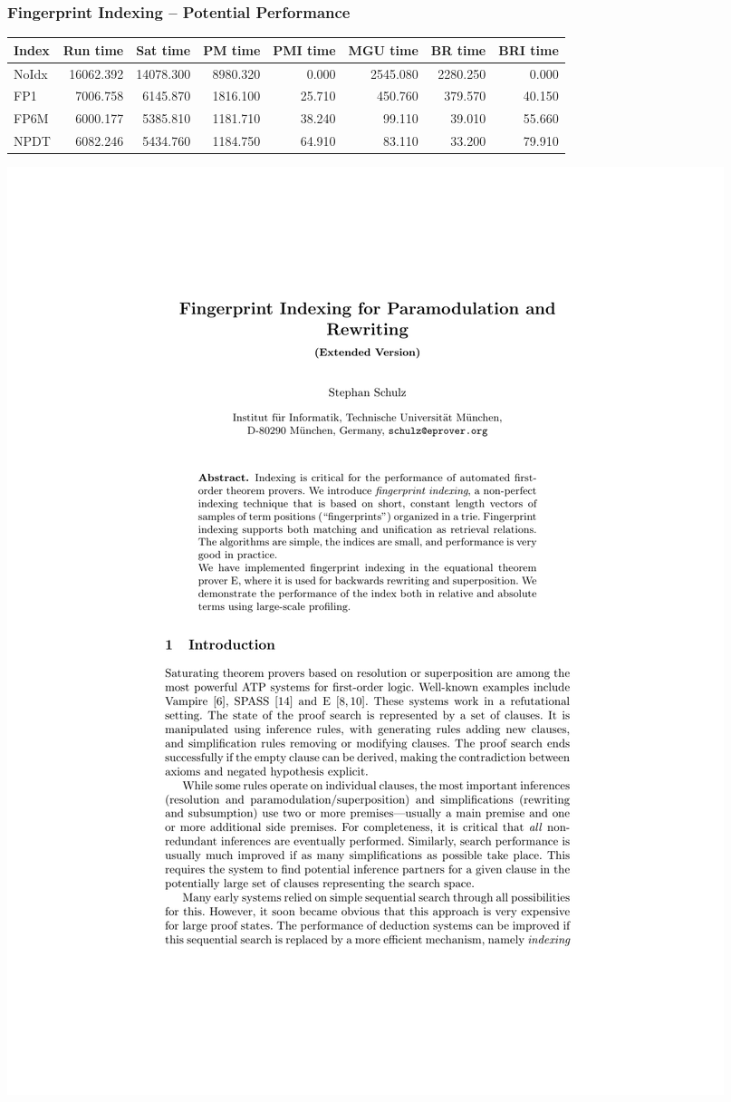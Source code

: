 \documentclass[10pt]{beamer}
\begin{document}
\begin{frame}
  \frametitle{Fingerprint Indexing -- Potential Performance}
  \begin{center}{\tiny
  \begin{tabular}{| l | r | r | r | r | r | r | r |} \hline
  Index & Run time & Sat time & PM time & PMI time & MGU time & BR time & BRI time \\ \hline
NoIdx & 16062.392 & 14078.300 &  8980.320 & 0.000 & 2545.080  & 2280.250 & 0.000\\
FP1 & 7006.758 & 6145.870 & 1816.100 & 25.710 & 450.760 & 379.570 & 40.150\\
FP6M & 6000.177 & 5385.810 & 1181.710 & 38.240 & 99.110 & 39.010 & 55.660\\
NPDT & 6082.246 & 5434.760 & 1184.750 & 64.910 & 83.110 & 33.200 & 79.910 \\\hline
  \end{tabular}}\vspace{0.5cm}
  \includegraphics[page=13,scale=0.5,trim=6cm 8cm 7cm 12cm,clip]{schulz_fp-index_ext}

\end{center}
\end{frame}
\end{document}
